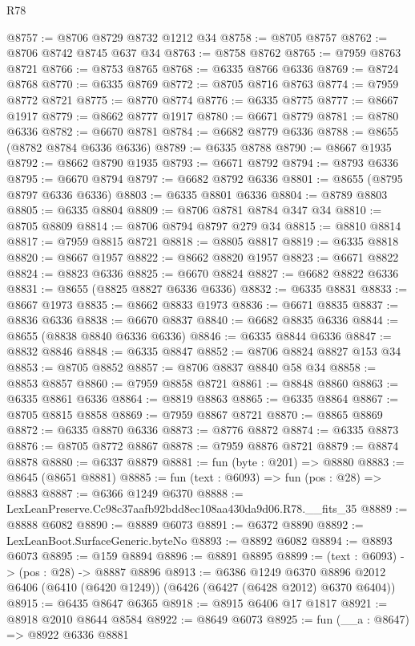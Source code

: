\begin{lexlean}{R78}
\begin{coremodule}
@8757 := @8706 @8729 @8732 @1212 @34
@8758 := @8705 @8757
@8762 := @8706 @8742 @8745 @637 @34
@8763 := @8758 @8762
@8765 := @7959 @8763 @8721
@8766 := @8753 @8765
@8768 := @6335 @8766 @6336
@8769 := @8724 @8768
@8770 := @6335 @8769
@8772 := @8705 @8716 @8763
@8774 := @7959 @8772 @8721
@8775 := @8770 @8774
@8776 := @6335 @8775
@8777 := @8667 @1917
@8779 := @8662 @8777 @1917
@8780 := @6671 @8779
@8781 := @8780 @6336
@8782 := @6670 @8781
@8784 := @6682 @8779 @6336
@8788 := @8655 (@8782 @8784 @6336 @6336)
@8789 := @6335 @8788
@8790 := @8667 @1935
@8792 := @8662 @8790 @1935
@8793 := @6671 @8792
@8794 := @8793 @6336
@8795 := @6670 @8794
@8797 := @6682 @8792 @6336
@8801 := @8655 (@8795 @8797 @6336 @6336)
@8803 := @6335 @8801 @6336
@8804 := @8789 @8803
@8805 := @6335 @8804
@8809 := @8706 @8781 @8784 @347 @34
@8810 := @8705 @8809
@8814 := @8706 @8794 @8797 @279 @34
@8815 := @8810 @8814
@8817 := @7959 @8815 @8721
@8818 := @8805 @8817
@8819 := @6335 @8818
@8820 := @8667 @1957
@8822 := @8662 @8820 @1957
@8823 := @6671 @8822
@8824 := @8823 @6336
@8825 := @6670 @8824
@8827 := @6682 @8822 @6336
@8831 := @8655 (@8825 @8827 @6336 @6336)
@8832 := @6335 @8831
@8833 := @8667 @1973
@8835 := @8662 @8833 @1973
@8836 := @6671 @8835
@8837 := @8836 @6336
@8838 := @6670 @8837
@8840 := @6682 @8835 @6336
@8844 := @8655 (@8838 @8840 @6336 @6336)
@8846 := @6335 @8844 @6336
@8847 := @8832 @8846
@8848 := @6335 @8847
@8852 := @8706 @8824 @8827 @153 @34
@8853 := @8705 @8852
@8857 := @8706 @8837 @8840 @58 @34
@8858 := @8853 @8857
@8860 := @7959 @8858 @8721
@8861 := @8848 @8860
@8863 := @6335 @8861 @6336
@8864 := @8819 @8863
@8865 := @6335 @8864
@8867 := @8705 @8815 @8858
@8869 := @7959 @8867 @8721
@8870 := @8865 @8869
@8872 := @6335 @8870 @6336
@8873 := @8776 @8872
@8874 := @6335 @8873
@8876 := @8705 @8772 @8867
@8878 := @7959 @8876 @8721
@8879 := @8874 @8878
@8880 := @6337 @8879
@8881 := fun (byte : @201) => @8880
@8883 := @8645 (@8651 @8881)
@8885 := fun (text : @6093) => fun (pos : @28) => @8883
@8887 := @6366 @1249 @6370
@8888 := LexLeanPreserve.Cc98c37aafb92bdd8ec108aa430da9d06.R78.__fits_35
@8889 := @8888 @6082
@8890 := @8889 @6073
@8891 := @6372 @8890
@8892 := LexLeanBoot.SurfaceGeneric.byteNo
@8893 := @8892 @6082
@8894 := @8893 @6073
@8895 := @159 @8894
@8896 := @8891 @8895
@8899 := (text : @6093) -> (pos : @28) -> @8887 @8896
@8913 := @6386
    @1249
    @6370
    @8896
    @2012
    @6406
    (@6410 (@6420 @1249))
    (@6426 (@6427 (@6428 @2012) @6370 @6404))
@8915 := @6435 @8647 @6365
@8918 := @8915 @6406 @17 @1817
@8921 := @8918 @2010 @8644 @8584
@8922 := @8649 @6073
@8925 := fun (__a : @8647) => @8922 @6336 @8881

\end{coremodule}
\end{lexlean}

